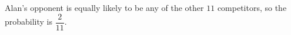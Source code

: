 Alan's opponent is equally likely to be any of the other $11$ competitors, so the probability is $\boxed{\dfrac2{11}}$.
